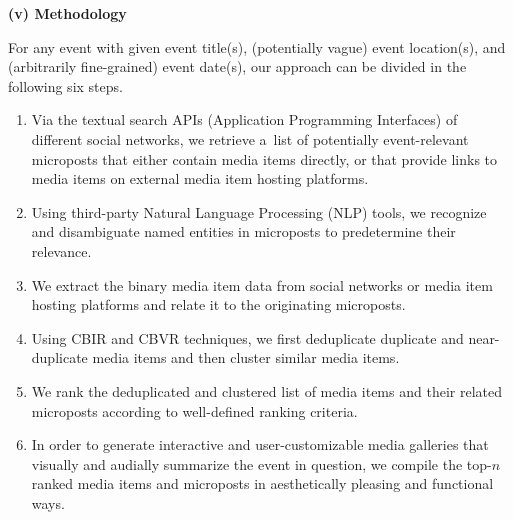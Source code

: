 \begin{abstracts}
\textbf{(v) Methodology}

For any event with given event title(s),
(potentially vague) event location(s), and
(arbitrarily fine-grained) event date(s), 
our approach can be divided in the following six steps.

\begin{enumerate}
  \item Via the textual search APIs (Application Programming Interfaces) of
        different social networks,
        we retrieve a~list of potentially event-relevant
        microposts that either contain media items directly,
        or that provide links to media items
        on external media item hosting platforms.
  \item Using third-party
        Natural Language Processing (NLP) tools,
        we recognize and disambiguate named entities
        in microposts to predetermine their relevance.
  \item We extract the binary media item data
        from social networks or media item hosting platforms
        and relate it to the originating microposts.
  \item Using CBIR and CBVR techniques, we first deduplicate
        duplicate and near-duplicate media items
        and then cluster similar media items.
  \item We rank the deduplicated and clustered list
        of media items and their related microposts
        according to well-defined ranking criteria.
  \item In order to generate interactive and user-customizable
        media galleries that visually and audially summarize the
        event in question, we compile the top-$n$ ranked
        media items and microposts in aesthetically pleasing
        and functional ways.
\end{enumerate}
\end{abstracts}
